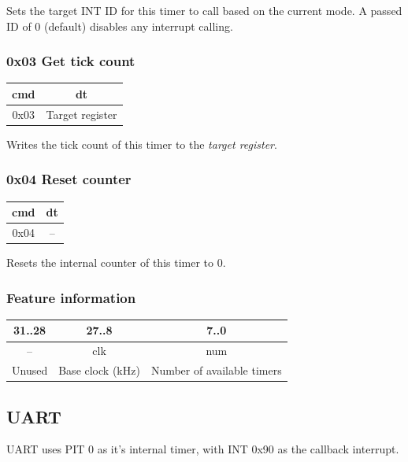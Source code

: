 \documentclass[a4paper,10pt]{article}
\begin{document}
Sets the target INT ID for this timer to call based on the current mode. A passed ID of 0 (default) disables any interrupt calling.

\subsubsection{0x03 Get tick count}
\begin{table}[H]
	\centering
	{
		\begin{tabular}{|c|c|}
\hline
cmd & dt \\
\hline
0x03 & Target register \\
\hline
		\end{tabular}
	}
\end{table}

Writes the tick count of this timer to the \emph{target register}.

\subsubsection{0x04 Reset counter}
\begin{table}[H]
	\centering
	{
		\begin{tabular}{|c|c|}
\hline
cmd & dt \\
\hline
0x04 & -- \\
\hline
		\end{tabular}
	}
\end{table}

Resets the internal counter of this timer to 0.

\subsubsection{Feature information} \label{pit:ft}
\begin{table}[H]
	\centering
	{
		\begin{tabular}{|c|c|c|}
\hline
31..28 & 27..8 & 7..0 \\
\hline
-- & clk & num \\
\hline
Unused & Base clock (kHz) & Number of available timers \\
\hline
		\end{tabular}
	}
\end{table}

\subsection{UART} \label{hw:uart}
UART uses PIT 0 as it's internal timer, with INT 0x90 as the callback interrupt.
\end{document}
